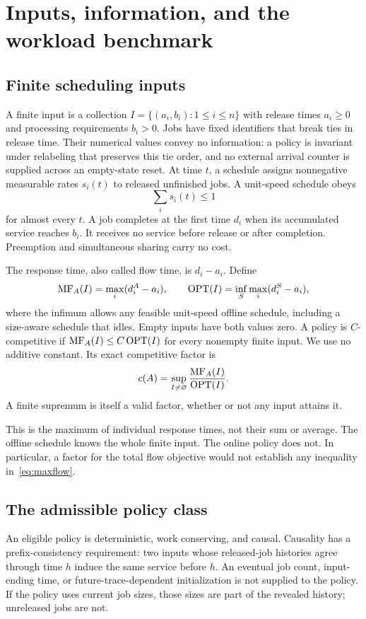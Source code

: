 \section{Inputs, information, and the workload benchmark}\label{sec:model}
\subsection{Finite scheduling inputs}
A finite input is a collection $I=\{(a_i,b_i):1\leq i\leq n\}$ with release times $a_i\geq0$ and processing requirements $b_i>0$. Jobs have fixed identifiers that break ties in release time. Their numerical values convey no information: a policy is invariant under relabeling that preserves this tie order, and no external arrival counter is supplied across an empty-state reset. At time $t$, a schedule assigns nonnegative measurable rates $s_i(t)$ to released unfinished jobs. A unit-speed schedule obeys
\begin{equation}\label{eq:capacity}
 \sum_i s_i(t)\leq1
\end{equation}
for almost every $t$. A job completes at the first time $d_i$ when its accumulated service reaches $b_i$. It receives no service before release or after completion. Preemption and simultaneous sharing carry no cost.

The response time, also called flow time, is $d_i-a_i$. Define
\begin{equation}\label{eq:maxflow}
 \operatorname{MF}_A(I)=\max_i(d_i^A-a_i),\qquad
 \operatorname{OPT}(I)=\inf_S\max_i(d_i^S-a_i),
\end{equation}
where the infimum allows any feasible unit-speed offline schedule, including a size-aware schedule that idles. Empty inputs have both values zero. A policy is $C$-competitive if $\operatorname{MF}_A(I)\leq C\operatorname{OPT}(I)$ for every nonempty finite input. We use no additive constant. Its exact competitive factor is
\begin{equation}\label{eq:exact-factor}
 c(A)=\sup_{I\ne\varnothing}\frac{\operatorname{MF}_A(I)}{\operatorname{OPT}(I)}.
\end{equation}
A finite supremum is itself a valid factor, whether or not any input attains it.

This is the maximum of individual response times, not their sum or average. The offline schedule knows the whole finite input. The online policy does not. In particular, a factor for the total flow objective would not establish any inequality in~\eqref{eq:maxflow}.

\subsection{The admissible policy class}
An eligible policy is deterministic, work conserving, and causal. Causality has a prefix-consistency requirement: two inputs whose released-job histories agree through time $h$ induce the same service before $h$. An eventual job count, input-ending time, or future-trace-dependent initialization is not supplied to the policy. If the policy uses current job sizes, those sizes are part of the revealed history; unreleased jobs are not.


